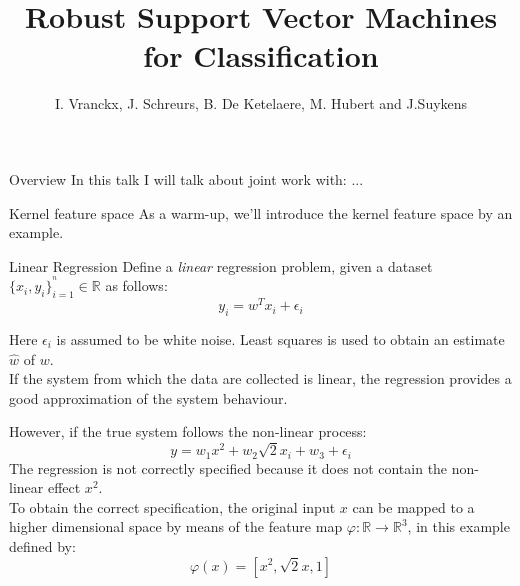\documentclass[10pt,]{beamer}
\title{Robust Support Vector Machines for Classification}
\author[statistics]{I. Vranckx, J. Schreurs, B. De Ketelaere, M. Hubert and J.Suykens}
\begin{document}

\begin{frame}[plain]
\maketitle  
\end{frame}

\begin{frame}{Overview}
In this talk I will talk about joint work with: ...
\end{frame}


\begin{frame}{Kernel feature space}
As a warm-up, we'll introduce the kernel feature space by an example.
\end{frame}

\begin{frame}{Linear Regression}
Define a \textit{linear} regression problem, given a
dataset $ \{x_{i},y_{i}\}_{i=1}^{^{n}}\in \mathbb{R}$ as follows:
\begin{equation}
	y_{i}=w^{T}x_{i}+\epsilon_{i}
	\label{eq:regression}
\end{equation}

Here $\epsilon_{i}$ is assumed to be white noise. Least squares is used to obtain an estimate $\hat{w}$ of $w$. \\
\vspace{0.5cm}
If the system from which the data are collected is linear, the
regression provides a good approximation of the system behaviour. 
\end{frame}

\begin{frame}
However, if the true system follows the non-linear process:
\begin{equation}
y=w_{1}x^{2}+w_{2}\sqrt{2}x_{i}+w_{3}+\epsilon_{i}
\end{equation}
The regression is not correctly specified because it does not contain
the non-linear effect $x^{2}$. \\
\vspace{0.5cm}
To obtain the correct specification, the original input $x$ can be mapped to a higher dimensional space
by means of the feature map $\varphi:\mathbb{R}\rightarrow\mathbb{R}^{3}$, in this example defined by:
\begin{equation}
\varphi(x)=[x^{2},\sqrt{2}x,1]
\end{equation}
\end{frame}
\end{document}
